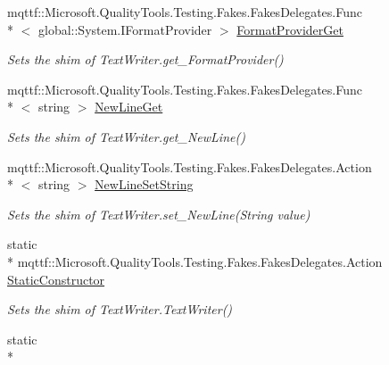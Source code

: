 \begin{DoxyCompactItemize}
mqttf\-::\-Microsoft.\-Quality\-Tools.\-Testing.\-Fakes.\-Fakes\-Delegates.\-Func\\*
$<$ global\-::\-System.\-I\-Format\-Provider $>$ \hyperlink{class_system_1_1_i_o_1_1_fakes_1_1_shim_text_writer_a20ebc01ccd055cf18a8a2d1cbbfe7b43}{Format\-Provider\-Get}
\begin{DoxyCompactList}\small\item\em Sets the shim of Text\-Writer.\-get\-\_\-\-Format\-Provider()\end{DoxyCompactList}\item 
mqttf\-::\-Microsoft.\-Quality\-Tools.\-Testing.\-Fakes.\-Fakes\-Delegates.\-Func\\*
$<$ string $>$ \hyperlink{class_system_1_1_i_o_1_1_fakes_1_1_shim_text_writer_a64f0e1afbca9129d9bb29a1f6272de92}{New\-Line\-Get}
\begin{DoxyCompactList}\small\item\em Sets the shim of Text\-Writer.\-get\-\_\-\-New\-Line()\end{DoxyCompactList}\item 
mqttf\-::\-Microsoft.\-Quality\-Tools.\-Testing.\-Fakes.\-Fakes\-Delegates.\-Action\\*
$<$ string $>$ \hyperlink{class_system_1_1_i_o_1_1_fakes_1_1_shim_text_writer_af62d7a51c465b0be210b0556d08ead93}{New\-Line\-Set\-String}
\begin{DoxyCompactList}\small\item\em Sets the shim of Text\-Writer.\-set\-\_\-\-New\-Line(\-String value)\end{DoxyCompactList}\item 
static \\*
mqttf\-::\-Microsoft.\-Quality\-Tools.\-Testing.\-Fakes.\-Fakes\-Delegates.\-Action \hyperlink{class_system_1_1_i_o_1_1_fakes_1_1_shim_text_writer_a5444e80f0b9289b9c1642eb51a899c84}{Static\-Constructor}
\begin{DoxyCompactList}\small\item\em Sets the shim of Text\-Writer.\-Text\-Writer()\end{DoxyCompactList}\item 
static \\*

\end{DoxyCompactItemize}
